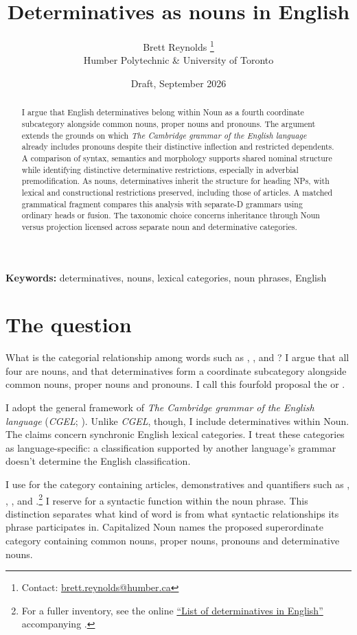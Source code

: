 \documentclass[12pt]{article}
\title{Determinatives as nouns in English}
\author{Brett Reynolds \orcidlink{0000-0003-0073-7195}%
\thanks{Contact: \href{mailto:brett.reynolds@humber.ca}{brett.reynolds@humber.ca}}\\
Humber Polytechnic \& University of Toronto}
\date{Draft, September 2026}
\begin{document}
\maketitle

\begin{abstract}
I argue that English determinatives belong within Noun as a fourth coordinate subcategory alongside common nouns, proper nouns and pronouns. The argument extends the grounds on which \textit{The Cambridge grammar of the English language} already includes pronouns despite their distinctive inflection and restricted dependents. A comparison of syntax, semantics and morphology supports shared nominal structure while identifying distinctive determinative restrictions, especially in adverbial premodification. As nouns, determinatives inherit the structure for heading NPs, with lexical and constructional restrictions preserved, including those of articles. A matched grammatical fragment compares this analysis with separate-D grammars using ordinary heads or fusion. The taxonomic choice concerns inheritance through Noun versus projection licensed across separate noun and determinative categories.
\end{abstract}

\noindent\textbf{Keywords:} determinatives, nouns, lexical categories, noun phrases, English

\section{The question}\label{sec:intro}

What is the categorial relationship among words such as , ,  and ? I argue that all four are nouns, and that determinatives form a coordinate subcategory alongside common nouns, proper nouns and pronouns. I call this fourfold proposal the  or .

I adopt the general framework of \textit{The Cambridge grammar of the English language} (\textit{CGEL}; \citealt{huddleston2002}). Unlike \textit{CGEL}, though, I include determinatives within Noun. The claims concern synchronic English lexical categories. I treat these categories as language-specific: a classification supported by another language's grammar doesn't determine the English classification.

I use  for the category containing articles, demonstratives and quantifiers such as , , ,  and .\footnote{For a fuller inventory, see the online \href{https://www.cambridge.org/highereducation/api/resources/2AC8DF5CA558F8A6FCDFACD0EAF8EA08}{\enquote{List of determinatives in English}} accompanying \textcite{Huddleston2021}.} I reserve  for a syntactic function within the noun phrase. This distinction separates what kind of word  is from what syntactic relationships its phrase participates in. Capitalized Noun names the proposed superordinate category containing common nouns, proper nouns, pronouns and determinative nouns.
\end{document}
